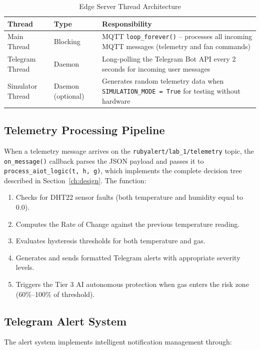 \documentclass[12pt,a4paper]{report}
\begin{document}
\begin{table}[H]
    \centering
    \begin{tabular}{|l|l|p{7cm}|}
        \hline
        \textbf{Thread} & \textbf{Type} & \textbf{Responsibility} \\ \hline
        Main Thread & Blocking & MQTT \texttt{loop\_forever()} -- processes all incoming MQTT messages (telemetry and fan commands) \\ \hline
        Telegram Thread & Daemon & Long-polling the Telegram Bot API every 2 seconds for incoming user messages \\ \hline
        Simulator Thread & Daemon (optional) & Generates random telemetry data when \texttt{SIMULATION\_MODE = True} for testing without hardware \\ \hline
    \end{tabular}
    \caption{Edge Server Thread Architecture}
    \label{tab:threads}
\end{table}

\subsection{Telemetry Processing Pipeline}
When a telemetry message arrives on the \texttt{rubyalert/lab\_1/telemetry} topic, the \texttt{on\_message()} callback parses the JSON payload and passes it to \texttt{process\_aiot\_logic(t, h, g)}, which implements the complete decision tree described in Section~\ref{ch:design}. The function:

\begin{enumerate}
    \item Checks for DHT22 sensor faults (both temperature and humidity equal to 0.0).
    \item Computes the Rate of Change against the previous temperature reading.
    \item Evaluates hysteresis thresholds for both temperature and gas.
    \item Generates and sends formatted Telegram alerts with appropriate severity levels.
    \item Triggers the Tier 3 AI autonomous protection when gas enters the risk zone (60\%--100\% of threshold).
\end{enumerate}

\subsection{Telegram Alert System}
The alert system implements intelligent notification management through:
\end{document}
